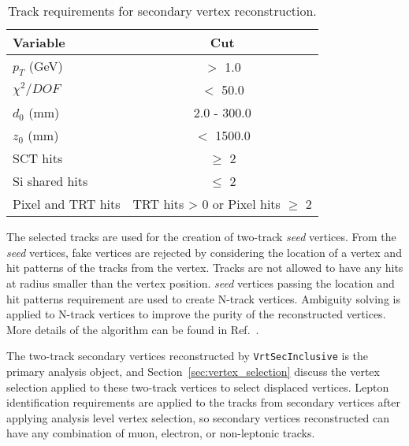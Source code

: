 \begin{table}[!htb]
  \centering
  \begin{tabular}{ l c }
    \hline
    \hline
	Variable      		& Cut                                         	\\
    \hline
	$p_{T}$ (GeV)		& $>$ 1.0										\\
	$\chi^{2} / DOF$	& $<$ 50.0										\\
	$d_{0}$	(mm)		& 2.0 - 300.0									\\
	$z_{0}$ (mm)		& $<$ 1500.0									\\
	SCT hits			& $\geq$ 2										\\
	Si shared hits	    & $\leq$ 2										\\
	Pixel and TRT hits  & TRT hits > 0 or Pixel hits $\geq$ 2			\\
    \hline
    \hline
  \end{tabular}
  \caption{Track requirements for secondary vertex reconstruction.}
  \label{table:vertex_track_selection_simple}
\end{table}

The selected tracks are used for the creation of two-track \textit{seed} vertices. From the \textit{seed} vertices, fake vertices are rejected by considering the location of a vertex and hit patterns of the tracks from the vertex. Tracks are not allowed to have any hits at radius smaller than the vertex position. \textit{seed} vertices passing the location and hit patterns requirement are used to create N-track vertices. Ambiguity solving is applied to N-track vertices to improve the purity of the reconstructed vertices. More details of the algorithm can be found in Ref.~\cite{ATLAS-CONF-2010-058}.

The two-track secondary vertices reconstructed by \texttt{VrtSecInclusive} is the primary analysis object, and Section~\ref{sec:vertex_selection} discuss the vertex selection applied to these two-track vertices to select displaced vertices. Lepton identification requirements are applied to the tracks from secondary vertices after applying analysis level vertex selection, so secondary vertices reconstructed can have any combination of muon, electron, or non-leptonic tracks.

